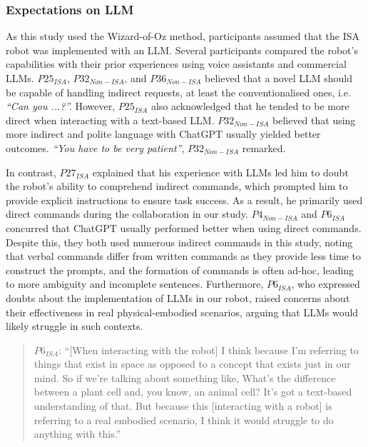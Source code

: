 \subsubsection{Expectations on LLM}
As this study used the Wizard-of-Oz method, participants assumed that the ISA robot was implemented with an LLM. Several participants compared the robot’s capabilities with their prior experiences using voice assistants and commercial LLMs. $P25_{ISA}$, $P32_{Non-ISA}$, and $P36_{Non-ISA}$ believed that a novel LLM should be capable of handling indirect requests, at least the conventionalised ones, i.e. \textit{``Can you ...?''.} However, $P25_{ISA}$ also acknowledged that he tended to be more direct when interacting with a text-based LLM. $P32_{Non-ISA}$ believed that using more indirect and polite language with ChatGPT usually yielded better outcomes. \textit{``You have to be very patient''}, $P32_{Non-ISA}$ remarked.

In contrast, $P27_{ISA}$ explained that his experience with LLMs led him to doubt the robot’s ability to comprehend indirect commands, which prompted him to provide explicit instructions to ensure task success. As a result, he primarily used direct commands during the collaboration in our study. $P4_{Non-ISA}$ and $P6_{ISA}$ concurred that ChatGPT usually performed better when using direct commands. Despite this, they both used numerous indirect commands in this study, noting that verbal commands differ from written commands as they provide less time to construct the prompts, and the formation of commands is often ad-hoc, leading to more ambiguity and incomplete sentences. Furthermore, $P6_{ISA}$, who expressed doubts about the implementation of LLMs in our robot, raised concerns about their effectiveness in real physical-embodied scenarios, arguing that LLMs would likely struggle in such contexts.

\begin{quote}
    $P6_{ISA}$: ``[When interacting with the robot] I think because I'm referring to things that exist in space as opposed to a concept that exists just in our mind. So if we're talking about something like, What's the difference between a plant cell and, you know, an animal cell? It's got a text-based understanding of that. But because this [interacting with a robot] is referring to a real embodied scenario, I think it would struggle to do anything with this.''
\end{quote}

